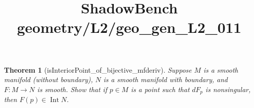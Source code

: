 \documentclass{article}
\title{ShadowBench geometry/L2/geo\_gen\_L2\_011}
\newtheorem{theorem}{Theorem}
\begin{document}
\maketitle

\begin{theorem}[isInteriorPoint_of_bijective_mfderiv]
Suppose $M$ is a smooth manifold (without boundary), $N$ is a smooth manifold with boundary, and $F: M \to N$ is smooth. Show that if $p \in M$ is a point such that $dF_p$ is nonsingular, then $F(p) \in \operatorname{Int} N$.
\end{theorem}
\end{document}
